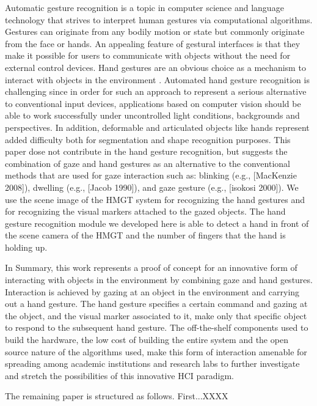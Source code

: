 \documentclass[jou,a4paper,notxfonts]{apa}
\begin{document}
 Automatic gesture recognition is a topic in computer science and language technology that strives to interpret human
 gestures via computational algorithms. Gestures can originate from any bodily motion or state but commonly originate
 from the face or hands. An appealing feature of gestural interfaces is that they make it possible for users to
 communicate with objects without the need for external control devices. Hand gestures are an obvious choice as a
 mechanism to interact with objects in the environment \cite{Rozado2012b,myicann2010}. Automated hand gesture
 recognition is challenging since in order for such an approach to represent a serious alternative to conventional input
 devices, applications based on computer vision should be able to work successfully under uncontrolled light conditions,
 backgrounds and perspectives. In addition, deformable and articulated objects like hands represent added difficulty
 both for segmentation and shape recognition purposes. This paper dose not contribute in the hand gesture recognition,
 but suggests the combination of gaze and hand gestures as an alternative to the conventional methods that are used for
 gaze interaction such as: blinking (e.g., [MacKenzie 2008]), dwelling (e.g., [Jacob 1990]), and gaze gesture (e.g.,
 [isokosi 2000]). We use the scene image of the HMGT system for recognizing the hand gestures and for recognizing the
 visual markers attached to the gazed objects. The hand gesture recognition module we developed here is able to detect a
 hand in front of the scene camera of the HMGT and the number of fingers that the hand is holding up.
 
 In Summary, this work represents a proof of concept for an innovative form of interacting with objects in the
 environment by combining gaze and hand gestures. Interaction is achieved by gazing at an object in the environment and
 carrying out a hand gesture. The hand gesture specifies a certain command and gazing at the object, and the visual
 marker associated to it, make only that specific object to respond to the subsequent hand gesture. The off-the-shelf
 components used to build the hardware, the low cost of building the entire system and the open source nature of the
 algorithms used, make this form of interaction amenable for spreading among academic institutions and research labs to
 further investigate and stretch the possibilities of this innovative HCI paradigm.

The remaining paper is structured as follows. First...XXXX
\end{document}
